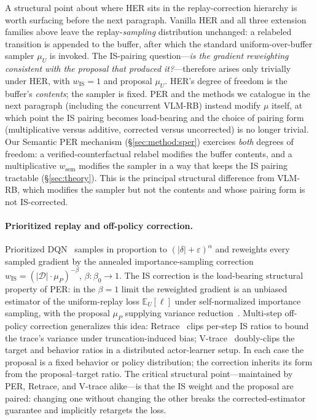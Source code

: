 \documentclass{article}
\begin{document}
A structural point about where HER sits in the replay-correction hierarchy
is worth surfacing before the next paragraph. Vanilla HER and all three
extension families above leave the replay-\emph{sampling} distribution
unchanged: a relabeled transition is appended to the buffer, after which
the standard uniform-over-buffer sampler $\mu_U$ is invoked. The IS-pairing
question---\emph{is the gradient reweighting consistent with the proposal
that produced it?}---therefore arises only trivially under HER, with
$w_{\text{IS}}\!=\!1$ and proposal $\mu_U$. HER's degree of freedom is the
buffer's \emph{contents}; the sampler is fixed. PER and the methods we
catalogue in the next paragraph (including the concurrent VLM-RB) instead
modify $\mu$ itself, at which point the IS pairing becomes load-bearing
and the choice of pairing form (multiplicative versus additive, corrected
versus uncorrected) is no longer trivial. Our Semantic PER mechanism
(\S\ref{sec:method:sper}) exercises \emph{both} degrees of freedom: a
verified-counterfactual relabel modifies the buffer contents, and a
multiplicative $w_{\text{sem}}$ modifies the sampler in a way that keeps
the IS pairing tractable (\S\ref{sec:theory}). This is the principal
structural difference from VLM-RB, which modifies the sampler but not the
contents and whose pairing form is not IS-corrected.

\paragraph{Prioritized replay and off-policy correction.}
Prioritized DQN~\citep{schaul2016per} samples in proportion to
$(|\delta|+\varepsilon)^\alpha$ and reweights every sampled gradient by the
annealed importance-sampling correction
$w_{\text{IS}}\!=\!(|\mathcal{D}|\cdot\mu_P)^{-\beta}$,
$\beta\colon\beta_0\!\to\!1$. The IS correction is the load-bearing
structural property of PER: in the $\beta\!=\!1$ limit the reweighted
gradient is an unbiased estimator of the uniform-replay loss
$\mathbb{E}_U[\ell]$ under self-normalized importance sampling, with the
proposal $\mu_P$ supplying variance reduction~\citep[Sec.~3.4]{schaul2016per}.
Multi-step off-policy correction generalizes this idea: Retrace~\citep{munos2016retrace}
clips per-step IS ratios to bound the trace's variance under
truncation-induced bias; V-trace~\citep{espeholt2018impala} doubly-clips the
target and behavior ratios in a distributed actor-learner setup. In each
case the proposal is a fixed behavior or policy distribution; the
correction inherits its form from the proposal--target ratio.
The critical structural point---maintained by PER, Retrace, and
V-trace alike---is that the IS weight and the proposal are paired: changing
one without changing the other breaks the corrected-estimator guarantee and
implicitly retargets the loss.
\end{document}
